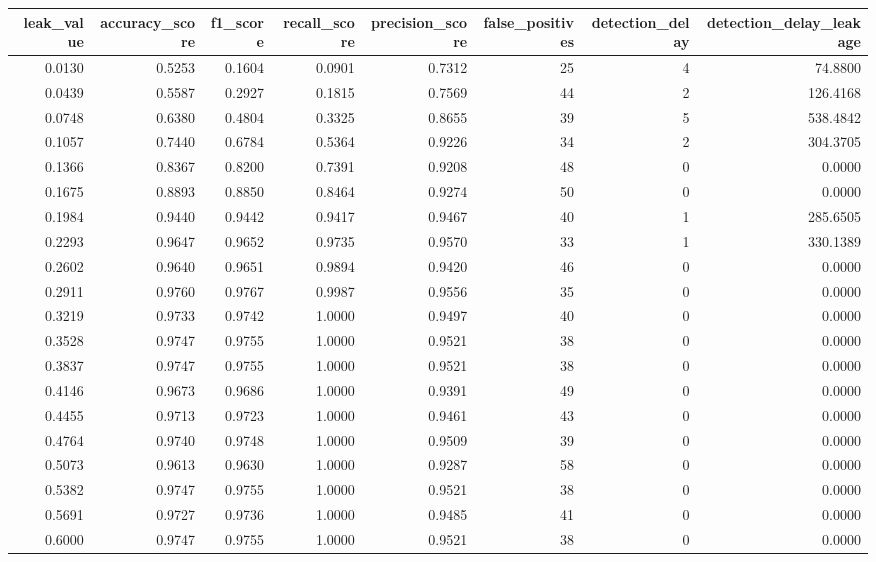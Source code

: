 \begin{tabular}{rrrrrrrr}
\toprule
leak\_value & accuracy\_score & f1\_score & recall\_score & precision\_score & false\_positives & detection\_delay & detection\_delay\_leakage \\
\midrule
0.0130 & 0.5253 & 0.1604 & 0.0901 & 0.7312 & 25 & 4 & 74.8800 \\
0.0439 & 0.5587 & 0.2927 & 0.1815 & 0.7569 & 44 & 2 & 126.4168 \\
0.0748 & 0.6380 & 0.4804 & 0.3325 & 0.8655 & 39 & 5 & 538.4842 \\
0.1057 & 0.7440 & 0.6784 & 0.5364 & 0.9226 & 34 & 2 & 304.3705 \\
0.1366 & 0.8367 & 0.8200 & 0.7391 & 0.9208 & 48 & 0 & 0.0000 \\
0.1675 & 0.8893 & 0.8850 & 0.8464 & 0.9274 & 50 & 0 & 0.0000 \\
0.1984 & 0.9440 & 0.9442 & 0.9417 & 0.9467 & 40 & 1 & 285.6505 \\
0.2293 & 0.9647 & 0.9652 & 0.9735 & 0.9570 & 33 & 1 & 330.1389 \\
0.2602 & 0.9640 & 0.9651 & 0.9894 & 0.9420 & 46 & 0 & 0.0000 \\
0.2911 & 0.9760 & 0.9767 & 0.9987 & 0.9556 & 35 & 0 & 0.0000 \\
0.3219 & 0.9733 & 0.9742 & 1.0000 & 0.9497 & 40 & 0 & 0.0000 \\
0.3528 & 0.9747 & 0.9755 & 1.0000 & 0.9521 & 38 & 0 & 0.0000 \\
0.3837 & 0.9747 & 0.9755 & 1.0000 & 0.9521 & 38 & 0 & 0.0000 \\
0.4146 & 0.9673 & 0.9686 & 1.0000 & 0.9391 & 49 & 0 & 0.0000 \\
0.4455 & 0.9713 & 0.9723 & 1.0000 & 0.9461 & 43 & 0 & 0.0000 \\
0.4764 & 0.9740 & 0.9748 & 1.0000 & 0.9509 & 39 & 0 & 0.0000 \\
0.5073 & 0.9613 & 0.9630 & 1.0000 & 0.9287 & 58 & 0 & 0.0000 \\
0.5382 & 0.9747 & 0.9755 & 1.0000 & 0.9521 & 38 & 0 & 0.0000 \\
0.5691 & 0.9727 & 0.9736 & 1.0000 & 0.9485 & 41 & 0 & 0.0000 \\
0.6000 & 0.9747 & 0.9755 & 1.0000 & 0.9521 & 38 & 0 & 0.0000 \\
\bottomrule
\end{tabular}
